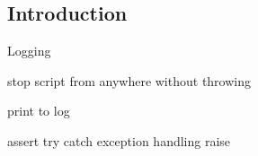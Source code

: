 
\subsection{Introduction}
Logging

stop script from anywhere without throwing

print to log

assert
try catch
exception handling
raise

